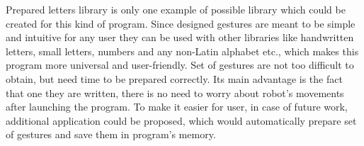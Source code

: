 Prepared letters library is only one example of possible library which could be created for this kind of program. Since designed gestures are meant to be simple and intuitive for any user they can be used with other libraries like handwritten letters, small letters, numbers and any non-Latin alphabet etc., which makes this program more universal and user-friendly. Set of gestures are not too difficult to obtain, but need time to be prepared correctly. Its main advantage is the fact that one they are written, there is no need to worry about robot’s movements after launching the program. To make it easier for user, in case of future work, additional application could be proposed, which would automatically prepare set of gestures and save them in program’s memory. 

